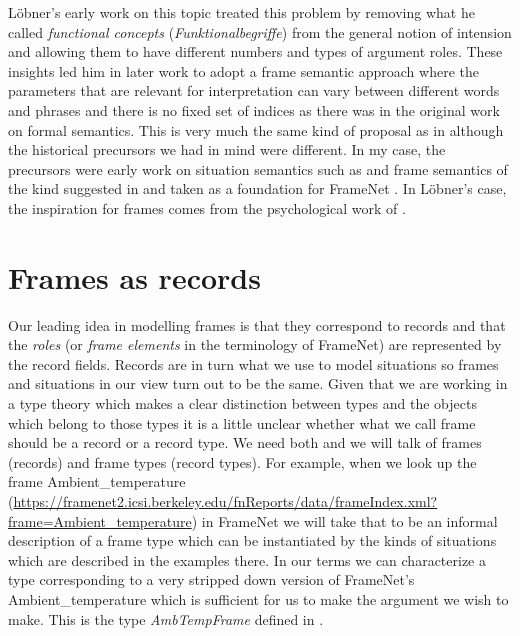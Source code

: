 Löbner's early work on this topic \citep{Lobner1979,Lobner1981}
treated this problem by removing what he called \textit{functional
  concepts} (\textit{Funktionalbegriffe}) from the general notion of
intension and allowing them to have different numbers and 
types of argument roles.  These insights led him in later work
\citep{Lobner2014,Loebner2015} to adopt a frame semantic approach
where the parameters that are relevant for interpretation can vary
between different words and phrases and there is no fixed set of
indices as there was in the original work on formal semantics.  This
is very much the same kind of proposal as in
\cite{Cooper2010,Cooper2012} although the historical precursors we had in
mind were different.  In my case, the precursors were early work on
situation semantics such as \cite{BarwisePerry1983} and frame
semantics of the kind suggested in \cite{Fillmore1982,Fillmore1985}
and taken as a foundation for FrameNet
\citep[][\url{https://framenet.icsi.berkeley.edu}]{RuppenhoferEllsworthPetruckJohnsonScheffczyk2006}.
In Löbner's case, the inspiration for frames comes from the
psychological work of \cite{Barsalou1992,Barsalou1992a,Barsalou1999}.

\section{Frames as records}

Our leading idea in modelling frames is that they correspond to
records and that the \textit{roles} (or \textit{frame elements} in the
terminology of FrameNet) are represented by the record fields.
Records are in turn what we use to model situations so frames and
situations in our view turn out to be the same.  Given that we are
working in a type theory which makes a clear distinction between types
and the objects which belong to those types it is a little unclear
whether what we call frame should be a record or a record type.  We
need both and we will talk of frames (records) and frame types (record
types).  For example, when we look up the frame Ambient\_temperature
(\url{https://framenet2.icsi.berkeley.edu/fnReports/data/frameIndex.xml?frame=Ambient_temperature})
in FrameNet we will take that to be an informal description of a frame
type which can be instantiated by the kinds of situations which are
described in the examples there.  In our terms we can characterize a
type corresponding to a very stripped down version of FrameNet's
Ambient\_temperature which is sufficient for us to make the argument
we wish to make.  This is the type \textit{AmbTempFrame} defined in \nexteg{}.
\begin{ex} 
\label{ex:AmbTempFrame} 
\end{ex}



